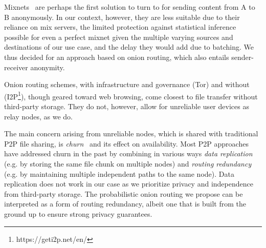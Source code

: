 Mixnets~\cite{Chaum:1981} are perhaps the first solution to turn to for sending content from A to B anonymously. In our context, however, they are less suitable due to their reliance on mix servers, the limited protection against statistical inference possible for even a perfect mixnet given the multiple varying sources and destinations of our use case, and the delay they would add due to batching. We thus decided for an approach based on onion routing, which also entails sender-receiver anonymity.

Onion routing schemes, with infrastructure and governance (\ac{Tor}) and 
without (I2P\footnote{https://geti2p.net/en/}), though geared toward web 
browsing, come closest to file transfer without third-party storage. They do 
not, however, allow for unreliable user devices as relay nodes, as we do. 

The main concern arising from unreliable nodes, which is shared with traditional P2P file sharing, is \emph{churn}~\cite{dhtchurn} and its effect on availability. %
Most P2P approaches have addressed churn in the past by combining in various ways \emph{data replication} (e.g. by storing the same file chunk on multiple nodes) and \emph{routing redundancy} (e.g. by maintaining multiple independent paths to the same node). Data replication does not work in our case as we prioritize privacy and independence from third-party storage. The probabilistic onion routing we propose can be interpreted as a form of routing redundancy, albeit one that is built from the ground up to ensure strong privacy guarantees.





